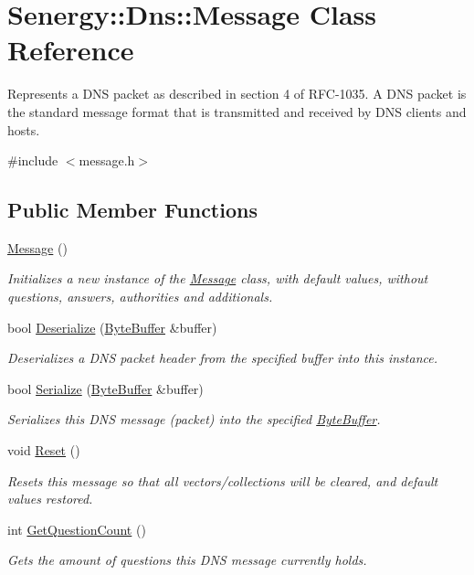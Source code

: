 \hypertarget{class_senergy_1_1_dns_1_1_message}{\section{Senergy\-:\-:Dns\-:\-:Message Class Reference}
\label{class_senergy_1_1_dns_1_1_message}
}


Represents a D\-N\-S packet as described in section 4 of R\-F\-C-\/1035. A D\-N\-S packet is the standard message format that is transmitted and received by D\-N\-S clients and hosts.  




{\ttfamily \#include $<$message.\-h$>$}

\subsection*{Public Member Functions}
\begin{DoxyCompactItemize}
\item 
\hyperlink{class_senergy_1_1_dns_1_1_message_a3e7192f2293903a43e7d08960b08a8b1}{Message} ()
\begin{DoxyCompactList}\small\item\em Initializes a new instance of the \hyperlink{class_senergy_1_1_dns_1_1_message}{Message} class, with default values, without questions, answers, authorities and additionals. \end{DoxyCompactList}\item 
bool \hyperlink{class_senergy_1_1_dns_1_1_message_a3857764a799ab123405420345f9b03ee}{Deserialize} (\hyperlink{class_senergy_1_1_byte_buffer}{Byte\-Buffer} \&buffer)
\begin{DoxyCompactList}\small\item\em Deserializes a D\-N\-S packet header from the specified buffer into this instance. \end{DoxyCompactList}\item 
bool \hyperlink{class_senergy_1_1_dns_1_1_message_a2e7978e799fadaa4f03fc881e5c8e0f6}{Serialize} (\hyperlink{class_senergy_1_1_byte_buffer}{Byte\-Buffer} \&buffer)
\begin{DoxyCompactList}\small\item\em Serializes this D\-N\-S message (packet) into the specified \hyperlink{class_senergy_1_1_byte_buffer}{Byte\-Buffer}. \end{DoxyCompactList}\item 
void \hyperlink{class_senergy_1_1_dns_1_1_message_a60d242fef8b20993f9cd9b4591453e1b}{Reset} ()
\begin{DoxyCompactList}\small\item\em Resets this message so that all vectors/collections will be cleared, and default values restored. \end{DoxyCompactList}\item 
int \hyperlink{class_senergy_1_1_dns_1_1_message_a5d5219532098cf60e2395764e7f61aca}{Get\-Question\-Count} ()
\begin{DoxyCompactList}\small\item\em Gets the amount of questions this D\-N\-S message currently holds. \end{DoxyCompactList}\end{DoxyCompactItemize}
